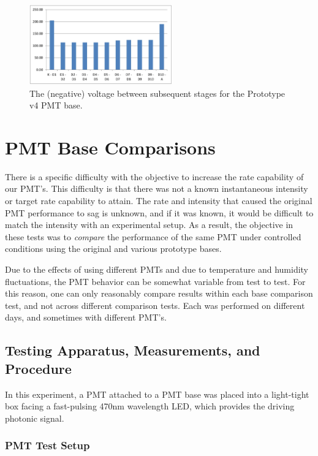 \begin{figure}
	\centerline{
		\mbox{\includegraphics[width=0.55\textwidth]{figures/v4-volt.jpg}}
	}
	\caption{The (negative) voltage between subsequent stages for the Prototype v4 PMT base.}
	\label{fig:v4-volt}
\end{figure}

\section{PMT Base Comparisons}

There is a specific difficulty with the objective to increase the rate capability of our PMT's. This difficulty is that there was not a known instantaneous intensity or target rate capability to attain. The rate and intensity that caused the original PMT performance to sag is unknown, and if it was known, it would be difficult to match the intensity with an experimental setup. As a result, the objective in these tests was to \emph{compare} the performance of the same PMT under controlled conditions using the original and various prototype bases.

Due to the effects of using different PMTs and due to temperature and humidity fluctuations, the PMT behavior can be somewhat variable from test to test. For this reason, one can only reasonably compare results within each base comparison test, and not across different comparison tests. Each was performed on different days, and sometimes with different PMT’s.

\subsection{Testing Apparatus, Measurements, and Procedure}

In this experiment, a PMT attached to a PMT base was placed into a light-tight box facing a fast-pulsing 470nm wavelength LED, which provides the driving photonic signal. 

\subsubsection{PMT Test Setup}

